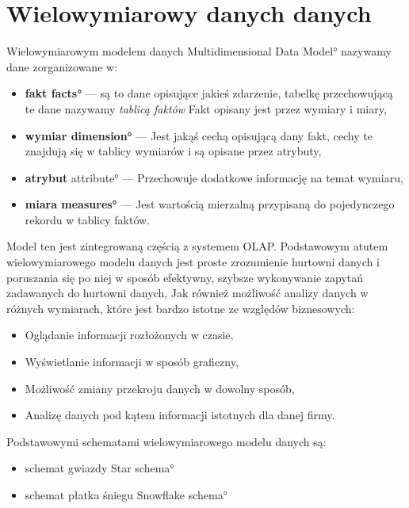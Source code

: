\section{Wielowymiarowy danych danych}
Wielowymiarowym modelem danych \ang{Multidimensional Data Model} 
nazywamy dane zorganizowane w:
\begin{itemize}
 \item \textbf{fakt \ang{facts}  } --- 
    są to dane opisujące jakieś zdarzenie, 
    tabelkę przechowującą te dane nazywamy  \textit{tablicą faktów} 
   Fakt opisany jest przez wymiary i miary,
 \item \textbf{wymiar \ang{dimension}} --- 
    Jest jakąś cechą opisującą dany fakt, cechy te znajdują się w tablicy wymiarów i są opisane przez atrybuty,
 \item \textbf{atrybut} \ang{ attribute}  --- 
    Przechowuje dodatkowe informację na temat wymiaru,
 \item \textbf{miara \ang{measures}} --- 
    Jest wartością mierzalną przypisaną do pojedynczego rekordu w tablicy faktów. 
\end{itemize}

Model ten jest zintegrowaną częścią z systemem OLAP.
Podstawowym atutem wielowymiarowego modelu danych jest proste zrozumienie hurtowni danych 
 i poruszania się po niej w sposób efektywny, szybsze wykonywanie zapytań zadawanych do hurtowni danych, 
Jak również możliwość analizy danych w różnych wymiarach, 
które jest bardzo istotne ze względów biznesowych:
\begin{itemize}
 \item Oglądanie informacji rozłożonych w czasie,
 \item Wyświetlanie informacji w sposób graficzny,
 \item Możliwość zmiany przekroju danych w dowolny sposób,
 \item Analizę danych pod kątem informacji istotnych dla danej firmy.
\end{itemize}

Podstawowymi schematami wielowymiarowego modelu danych są:
\begin{itemize}
 \item schemat gwiazdy \ang{Star schema} 
 \item schemat płatka śniegu \ang{Snowflake schema}
\end{itemize}

